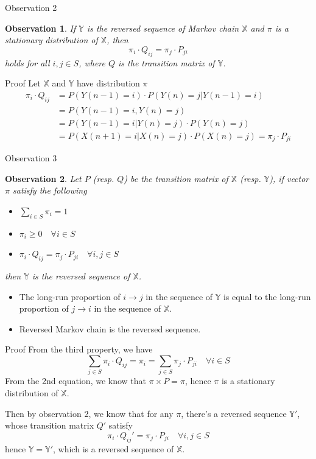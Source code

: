 \documentclass[mathserif]{beamer}
\newtheorem{obs}{Observation}
\begin{document}
\begin{frame}{Observation 2}
\begin{obs}
If $\mathbb{Y}$ is the reversed sequence of Markov chain $\mathbb{X}$ and $\pi$ is a stationary distribution of $\mathbb{X}$, then
\[
\pi_i \cdot Q_{ij} = \pi_j \cdot P_{ji}
\]
holds for all $i,j \in S$, where $Q$ is the transition matrix of $\mathbb{Y}$.
\end{obs}
\end{frame}

\begin{frame}{Proof}
Let $\mathbb{X}$ and $\mathbb{Y}$ have distribution $\pi$
\begin{align*}
\pi_i \cdot Q_{ij} & = P(Y(n-1)=i)\cdot P(Y(n)=j|Y(n-1)=i) \\
& = P(Y(n-1)=i, Y(n)=j) \\
& = P(Y(n-1)=i|Y(n)=j)\cdot P(Y(n)=j) \\
& = P(X(n+1)=i|X(n)=j)\cdot P(X(n)=j) = \pi_j \cdot P_{ji}
\end{align*}
\end{frame}

\begin{frame}{Observation 3}
\begin{obs}
Let $P$ (resp. $Q$) be the transition matrix of $\mathbb{X}$ (resp. $\mathbb{Y}$),
if vector $\pi$ satisfy the following
\begin{itemize}
\item $\sum_{i\in S} \pi_i = 1$
\item $\pi_i \geq 0 \quad\forall i \in S$
\item $\pi_i \cdot Q_{ij} = \pi_j \cdot P_{ji} \quad\forall i,j \in S$
\end{itemize}
then $\mathbb{Y}$ is the reversed sequence of $\mathbb{X}$.
\end{obs}
\begin{itemize}
\item The long-run proportion of $i\to j$ in the sequence of $\mathbb{Y}$ is equal to the long-run proportion of $j\to i$ in the sequence of $\mathbb{X}$.
\item Reversed Markov chain is the reversed sequence.
\end{itemize}
\end{frame}

\begin{frame}{Proof}
From the third property, we have
\[
\sum_{j\in S} \pi_i \cdot Q_{ij} = \pi_i = \sum_{j\in S} \pi_j \cdot P_{ji} \quad\forall i \in S
\]
From the 2nd equation, we know that $\pi \times P = \pi$, hence $\pi$ is a stationary distribution of $\mathbb{X}$.

Then by observation 2, we know that for any $\pi$, there's a reversed sequence $\mathbb{Y}'$, whose transition matrix $Q'$ satisfy
\[
\pi_i \cdot Q_{ij}' = \pi_j \cdot P_{ji} \quad\forall i,j \in S
\]
hence $\mathbb{Y} = \mathbb{Y}'$, which is a reversed sequence of $\mathbb{X}$.
\end{frame}
\end{document}

